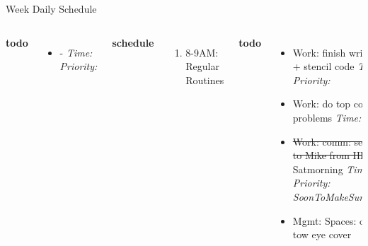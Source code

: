 \documentclass[serif, mathserif, final]{beamer}
\newcommand{\doneTask}[1]{\tiny \item \tiny \sout{#1}}
\newcommand{\timeEst}[1]{\textit{Time:} \textit{#1}}
\newcommand{\priority}[1]{\textit{Priority:} \textit{#1}}
\newcommand{\deadline}[1]{#1}
\begin{document}
\begin{frame}{}
\begin{columns}
\begin{column}{0.50\linewidth}
\begin{block}{Week Daily Schedule}
\begin{columns}
  \textbf{\small todo}\\ 
  \begin{itemize} 
    \tiny \item \tiny -  \deadline{ }   \timeEst{}  \priority{} 
  \end{itemize} 
  \textbf{\small schedule}\\
  \begin{enumerate} 
    \tiny \item \tiny 8-9AM: Regular Routines 
  \end{enumerate}
  
  \textbf{\small todo}\\
  \begin{itemize} 
    \tiny \item \tiny Work: finish writing the hw + stencil code \deadline{ }
    \timeEst{}  \priority{} 
    \tiny \item \tiny Work: do top coder practice problems \deadline{}   \timeEst{}  \priority{} 
   \doneTask{Work: comm: send message to Mike from HLF} \deadline{Satmorning }   \timeEst{10 mins}
   \priority{SoonToMakeSureOthersKnow} 
   \tiny \item \tiny Mgmt: Spaces: order BMW tow eye cover 
  \end{itemize} 
  \textbf{\small schedule}\\ 
  \begin{enumerate} 
    \tiny \item \tiny 8-9AM: Regular Routines 
  \end{enumerate}

  \textbf{\small todo}\\
  \begin{itemize} 
    \tiny \item \tiny Work: top coder practice problems \timeEst{8
      hours}  \priority{High} 

    \tiny \item \tiny Comm: graduation party  \timeEst{30} \deadline{} \priority{}
  \end{itemize}
  \textbf{\small schedule}\\ 
  \begin{enumerate} 
    \tiny \item \tiny 
  \end{enumerate} 
    \end{columns}
  \end{block} 


\end{column}
\end{columns}
\end{frame}
\end{document}

